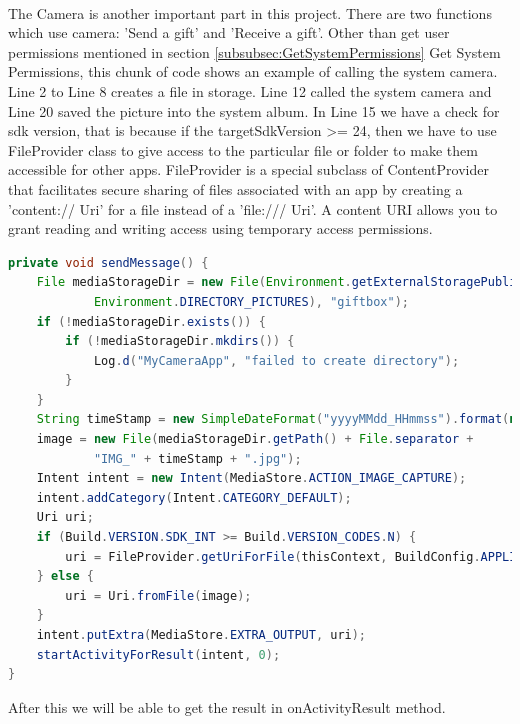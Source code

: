 \paragraph{} The Camera is another important part in this project. There are two functions which use camera: 'Send a gift' and 'Receive a gift'.
Other than get user permissions mentioned in section \ref{subsubsec:GetSystemPermissions} Get System Permissions, this chunk of code shows an example of calling the system camera. Line 2 to Line 8 creates a file in storage. Line 12 called the system camera and Line 20 saved the picture into the system album. In Line 15 we have a check for sdk version, that is because if the targetSdkVersion >= 24, then we have to use FileProvider class to give access to the particular file or folder to make them accessible for other apps. FileProvider is a special subclass of ContentProvider that facilitates secure sharing of files associated with an app by creating a 'content:// Uri' for a file instead of a 'file:/// Uri'. A content URI allows you to grant reading and writing access using temporary access permissions. 
\begin{lstlisting}[language=JAVA] 
private void sendMessage() {
    File mediaStorageDir = new File(Environment.getExternalStoragePublicDirectory(
            Environment.DIRECTORY_PICTURES), "giftbox");
    if (!mediaStorageDir.exists()) {
        if (!mediaStorageDir.mkdirs()) {
            Log.d("MyCameraApp", "failed to create directory");
        }
    }
    String timeStamp = new SimpleDateFormat("yyyyMMdd_HHmmss").format(new Date());
    image = new File(mediaStorageDir.getPath() + File.separator +
            "IMG_" + timeStamp + ".jpg");
    Intent intent = new Intent(MediaStore.ACTION_IMAGE_CAPTURE);
    intent.addCategory(Intent.CATEGORY_DEFAULT);
    Uri uri;
    if (Build.VERSION.SDK_INT >= Build.VERSION_CODES.N) {
        uri = FileProvider.getUriForFile(thisContext, BuildConfig.APPLICATION_ID+".fileprovider", image);//BuildConfig.APPLICATION_ID + ".fileProvider"
    } else {
        uri = Uri.fromFile(image);
    }
    intent.putExtra(MediaStore.EXTRA_OUTPUT, uri);
    startActivityForResult(intent, 0);
}
\end{lstlisting} 
\par After this we will be able to get the result in onActivityResult method.